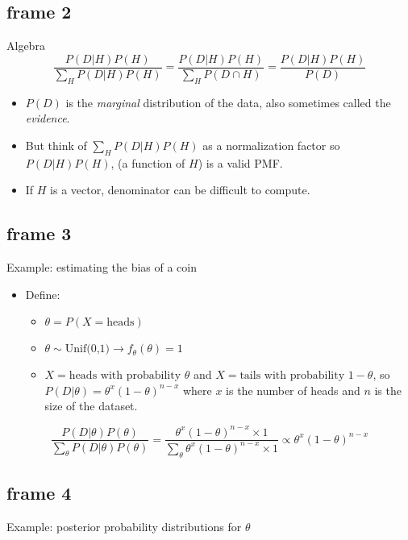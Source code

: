 \documentclass[xcolor=x11names,compress]{beamer}
\renewcommand{\(}{\begin{columns}}
\renewcommand{\)}{\end{columns}}
\newcommand{\<}[1]{\begin{column}{#1}}
\renewcommand{\>}{\end{column}}
\begin{document}
\subsection{frame 2}
\begin{frame}{Algebra}
$$\frac{P(D|H)P(H)}{\sum_H P(D|H)P(H)}=\frac{P(D|H)P(H)}{\sum_H P(D \cap H)}=\frac{P(D|H)P(H)}{P(D)}$$
\begin{itemize}
\pause \item $P(D)$ is the \textit{marginal} distribution of the data, also sometimes called the \textit{evidence}.
\pause \item But think of $\sum_H P(D|H)P(H)$ as a normalization factor so $P(D|H)P(H)$, (a function of $H$) is a valid PMF.
\pause \item If $H$ is a vector, denominator can be difficult to compute.
\end{itemize}
\end{frame}

\subsection{frame 3}
\begin{frame}{Example: estimating the bias of a coin}
\begin{itemize}
\item[] Define:
\begin{itemize}
	\item $\theta=P(X=\text{heads})$
	\pause \item $\theta \sim \text{Unif(0,1)} \rightarrow f_{\theta}(\theta)=1$
	\item $X=\text{heads with probability } \theta$ and $X=\text{tails with probability } 1-\theta$, so $P(D|\theta)=\theta^x(1-\theta)^{n-x}$ where $x$ is the number of heads and $n$ is the size of the dataset.
	\end{itemize}
\end{itemize}
\vspace{0.5cm}
\pause $$\frac{P(D|\theta)P(\theta)}{\sum_\theta P(D|\theta)P(\theta)}=\frac{\theta^x(1-\theta)^{n-x} \times 1}{\sum_\theta \theta^x(1-\theta)^{n-x} \times 1}\propto \theta^x(1-\theta)^{n-x}$$
\end{frame}


\subsection{frame 4}
\begin{frame}{Example: posterior probability distributions for $\theta$}
\centering
{}
\end{frame}
\end{document}
